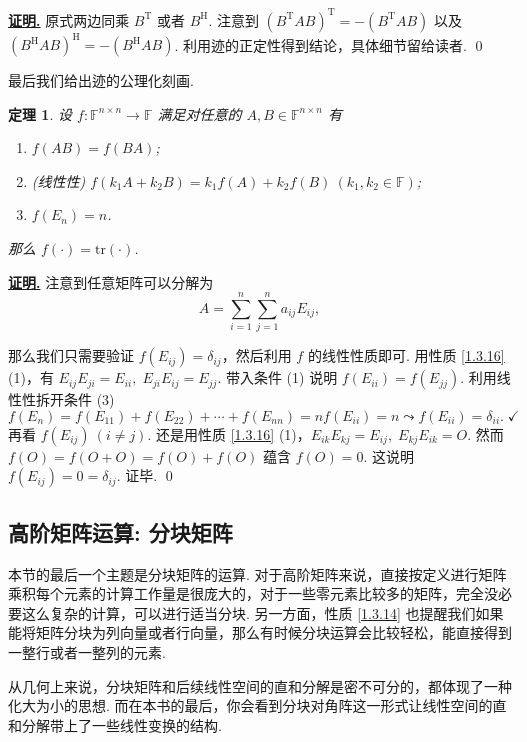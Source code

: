 \documentclass[10pt,openany]{article}
\theoremstyle{thmstyle} %
\newtheorem{theorem}{定理}[subsection]
\theoremstyle{defstyle} %
\theoremstyle{prostyle} %
\theoremstyle{exastyle}
\theoremstyle{remstyle}
\renewenvironment{proof}[1][证明]{\par\underline{\textbf{#1.}} \;\fangsong}{\qed\par}
\newcommand{\T}{^{\text{T}}}
\newcommand{\Her}{^{\text{H}}}
\newcommand{\F}{\mathbb{F}}
\newcommand{\n}{^{n \times n}}
\newcommand{\tr}{\mathrm{tr}}
\begin{document}
\begin{proof}
	原式两边同乘 \( B\T \) 或者 \( B\Her \). 注意到 \( (B\T AB)\T=-(B\T AB) \) 以及 \( (B\Her AB)\Her=-(B\Her AB) \). 利用迹的正定性得到结论，具体细节留给读者. 
\end{proof}

\vspace{1ex}

最后我们给出迹的公理化刻画. 

\begin{theorem}
	设 \( f: \F\n \to \F \) 满足对任意的 \( A,B \in \F\n \) 有
	\begin{enumerate}[(1)]
		\item \( f(AB)=f(BA) \);
		\item (线性性) \( f(k_1A+k_2B)=k_1f(A)+k_2f(B) \ (k_1,k_2 \in \F) \);
		\item \( f(E_n)=n \).
	\end{enumerate}
	
	那么 \( f(\cdot)=\tr(\cdot) \).
\end{theorem}

\begin{proof}
	注意到任意矩阵可以分解为
	\[ A=\sum_{i=1}^{n}\sum_{j=1}^{n} a_{ij}E_{ij}, \]
	
	那么我们只需要验证 \( f(E_{ij})=\delta_{ij} \)，然后利用 \( f \) 的线性性质即可. 用性质 \ref{1.3.16} (1)，有 \( E_{ij}E_{ji}=E_{ii}, \; E_{ji}E_{ij}=E_{jj} \). 带入条件 (1) 说明 \( f(E_{ii})=f(E_{jj}) \). 利用线性性拆开条件 (3) 
	\[ f(E_n)=f(E_{11})+f(E_{22})+\cdots+f(E_{nn})= nf(E_{ii})=n \leadsto f(E_{ii})=\delta_{ii}. \; \checkmark \]
	再看 \( f(E_{ij}) \ (i \neq j) \). 还是用性质 \ref{1.3.16} (1)，\( E_{ik}E_{kj}=E_{ij}, \; E_{kj}E_{ik}=O \). 然而 \( f(O)=f(O+O)=f(O)+f(O) \) 蕴含 \( f(O)=0 \). 这说明 \( f(E_{ij})=0=\delta_{ij} \). 证毕.
\end{proof}

\subsection{高阶矩阵运算: 分块矩阵}

本节的最后一个主题是分块矩阵的运算. 对于高阶矩阵来说，直接按定义进行矩阵乘积每个元素的计算工作量是很庞大的，对于一些零元素比较多的矩阵，完全没必要这么复杂的计算，可以进行适当分块. 另一方面，性质 \ref{1.3.14} 也提醒我们如果能将矩阵分块为列向量或者行向量，那么有时候分块运算会比较轻松，能直接得到一整行或者一整列的元素.

从几何上来说，分块矩阵和后续线性空间的直和分解是密不可分的，都体现了一种化大为小的思想. 而在本书的最后，你会看到分块对角阵这一形式让线性空间的直和分解带上了一些线性变换的结构. 
\end{document}
